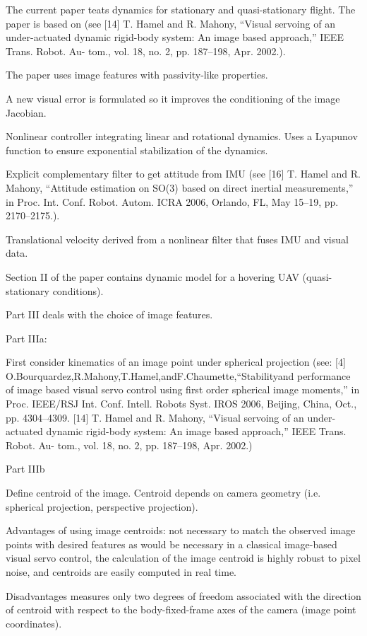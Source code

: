 The current paper teats dynamics for stationary and quasi-stationary flight. The paper is based on (see 
[14] T. Hamel and R. Mahony, “Visual servoing of an under-actuated dynamic rigid-body system: An image based approach,” IEEE Trans. Robot. Au- tom., vol. 18, no. 2, pp. 187–198, Apr. 2002.). 

The paper uses image features with passivity-like properties.

A new visual error is formulated so it improves the conditioning of the image Jacobian.

Nonlinear controller integrating linear and rotational dynamics. Uses a Lyapunov function to ensure exponential stabilization of the dynamics.

Explicit complementary filter to get attitude from IMU (see [16] T. Hamel and R. Mahony, “Attitude estimation on SO(3) based on direct inertial measurements,” in Proc. Int. Conf. Robot. Autom. ICRA 2006, Orlando, FL, May 15–19, pp. 2170–2175.).

Translational velocity derived from a nonlinear filter that fuses IMU and visual data.

Section II of the paper contains dynamic model for a hovering UAV (quasi-stationary conditions).

Part III deals with the choice of image features. 

Part IIIa:

First consider kinematics of an image point under spherical projection (see: [4] O.Bourquardez,R.Mahony,T.Hamel,andF.Chaumette,“Stabilityand performance of image based visual servo control using first order spherical image moments,” in Proc. IEEE/RSJ Int. Conf. Intell. Robots Syst. IROS 2006, Beijing, China, Oct., pp. 4304–4309. [14] T. Hamel and R. Mahony, “Visual servoing of an under-actuated dynamic rigid-body system: An image based approach,” IEEE Trans. Robot. Au- tom., vol. 18, no. 2, pp. 187–198, Apr. 2002.)

Part IIIb

Define centroid of the image. Centroid depends on camera geometry (i.e. spherical projection, perspective projection). 

Advantages of using image centroids: not necessary to match the observed image points with desired features as would be necessary in a classical image-based visual servo control, the calculation of the image centroid is highly robust to pixel noise, and centroids are easily computed in real time.

Disadvantages measures only two degrees of freedom associated with the direction of centroid with respect to the body-fixed-frame axes of the camera (image point coordinates).

